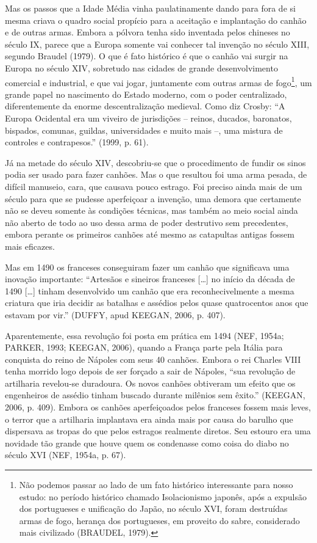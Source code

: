 Mas os passos que a Idade Média vinha paulatinamente dando para fora de
si mesma criava o quadro social propício para a aceitação e implantação
do canhão e de outras armas. Embora a pólvora tenha sido inventada pelos
chineses no século IX, parece que a Europa somente vai conhecer tal
invenção no século XIII, segundo Braudel (1979). O que é fato histórico
é que o canhão vai surgir na Europa no século XIV, sobretudo nas cidades
de grande desenvolvimento comercial e industrial, e que vai jogar,
juntamente com outras armas de fogo\footnote{Não podemos passar ao lado
  de um fato histórico interessante para nosso estudo: no período
  histórico chamado Isolacionismo japonês, após a expulsão dos
  portugueses e unificação do Japão, no século XVI, foram destruídas
  armas de fogo, herança dos portugueses, em proveito do sabre,
  considerado mais civilizado (BRAUDEL, 1979).}, um grande papel no
nascimento do Estado moderno, com o poder centralizado, diferentemente
da enorme descentralização medieval. Como diz Crosby: ``A Europa
Ocidental era um viveiro de jurisdições -- reinos, ducados, baronatos,
bispados, comunas, guildas, universidades e muito mais --, uma mistura
de controles e contrapesos.'' (1999, p. 61).

Já na metade do século XIV, descobriu-se que o procedimento de fundir os
sinos podia ser usado para fazer canhões. Mas o que resultou foi uma
arma pesada, de difícil manuseio, cara, que causava pouco estrago. Foi
preciso ainda mais de um século para que se pudesse aperfeiçoar a
invenção, uma demora que certamente não se deveu somente às condições
técnicas, mas também ao meio social ainda não aberto de todo ao uso
dessa arma de poder destrutivo sem precedentes, embora perante os
primeiros canhões até mesmo as catapultas antigas fossem mais eficazes.

Mas em 1490 os franceses conseguiram fazer um canhão que significava uma
inovação importante: ``Artesãos e sineiros franceses {[}\ldots{}{]} no
início da década de 1490 {[}\ldots{}{]} tinham desenvolvido um canhão
que era reconhecivelmente a mesma criatura que iria decidir as batalhas
e assédios pelos quase quatrocentos anos que estavam por vir.'' (DUFFY,
apud KEEGAN, 2006, p. 407).

Aparentemente, essa revolução foi posta em prática em 1494 (NEF, 1954a;
PARKER, 1993; KEEGAN, 2006), quando a França parte pela Itália para
conquista do reino de Nápoles com seus 40 canhões. Embora o rei Charles
VIII tenha morrido logo depois de ser forçado a sair de Nápoles, ``sua
revolução de artilharia revelou-se duradoura. Os novos canhões obtiveram
um efeito que os engenheiros de assédio tinham buscado durante milênios
sem êxito.'' (KEEGAN, 2006, p. 409). Embora os canhões aperfeiçoados
pelos franceses fossem mais leves, o terror que a artilharia implantava
era ainda mais por causa do barulho que dispersava as tropas do que
pelos estragos realmente diretos. Seu estouro era uma novidade tão
grande que houve quem os condenasse como coisa do diabo no século XVI
(NEF, 1954a, p. 67).

